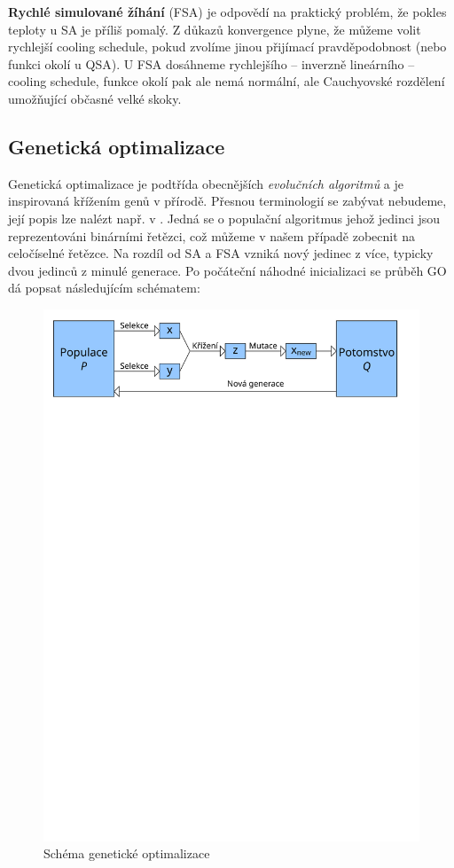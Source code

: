 \textbf{Rychlé simulované žíhání} (FSA) \cite{VFSA} je odpovědí na praktický problém, že pokles teploty u SA je příliš pomalý. Z důkazů konvergence plyne, že můžeme volit rychlejší cooling schedule, pokud zvolíme jinou přijímací pravděpodobnost (nebo funkci okolí u QSA). U FSA dosáhneme rychlejšího -- inverzně lineárního -- cooling schedule, funkce okolí pak ale nemá normální, ale Cauchyovské rozdělení umožňující občasné velké skoky.


\subsection{Genetická optimalizace}

Genetická optimalizace je podtřída obecnějších \emph{evolučních algoritmů} a je inspirovaná křížením genů v přírodě. Přesnou terminologií se zabývat nebudeme, její popis lze nalézt např. v \cite[p.~141]{GO ebook}. Jedná se o populační algoritmus jehož jedinci jsou reprezentováni binárními řetězci, což můžeme v našem případě zobecnit na celočíselné řetězce. Na rozdíl od SA a FSA vzniká nový jedinec z více, typicky dvou jedinců z minulé generace. Po počáteční náhodné inicializaci se průběh GO dá popsat následujícím schématem:

\begin{figure}[h!]\label{EA fig}
  \includegraphics[width=\textwidth]{img/EA}
  \caption{Schéma genetické optimalizace}
\end{figure}

